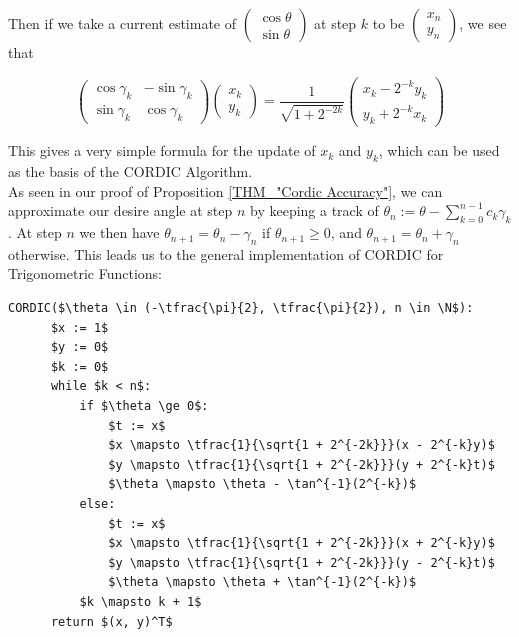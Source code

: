 {Then if we take a current estimate of \(\left(\begin{array}{c}\cos\theta\\\sin\theta\end{array}\right)\) at step \(k\) to be \(\left(\begin{array}{c}x_n\\y_n\end{array}\right)\), we see that

\begin{displaymath}
	\left(\begin{array}{cc}
		\cos\gamma_k & - \sin\gamma_k\\
		\sin\gamma_k & \cos\gamma_k
	\end{array}\right)
	\left(\begin{array}{c}
		x_k \\ y_k
	\end{array}\right)
	= \frac{1}{\sqrt{1 + 2^{-2k}}}
	\left(\begin{array}{c}
		x_k - 2^{-k}y_k\\
		y_k + 2^{-k}x_k
	\end{array}\right)
\end{displaymath}

This gives a very simple formula for the update of \(x_k\) and \(y_k\), which can be used as the basis of the CORDIC Algorithm.\\

As seen in our proof of Proposition \ref{THM_"Cordic Accuracy"}, we can approximate our desire angle at step \(n\) by keeping a track of \(\theta_n := \theta - \sum_{k=0}^{n-1}c_k\gamma_k\). At step \(n\) we then have \(\theta_{n+1} = \theta_n - \gamma_n\) if \(\theta_{n+1} \ge 0\), and \(\theta_{n+1} = \theta_n + \gamma_n\) otherwise. This leads us to the general implementation of CORDIC for Trigonometric Functions:

\begin{lstlisting}[caption={General Cordic},label={PCD_"General_Cordic"}]
  CORDIC($\theta \in (-\tfrac{\pi}{2}, \tfrac{\pi}{2}), n \in \N$):
      $x := 1$
      $y := 0$
      $k := 0$
      while $k < n$:
          if $\theta \ge 0$:
              $t := x$
              $x \mapsto \tfrac{1}{\sqrt{1 + 2^{-2k}}}(x - 2^{-k}y)$
              $y \mapsto \tfrac{1}{\sqrt{1 + 2^{-2k}}}(y + 2^{-k}t)$
              $\theta \mapsto \theta - \tan^{-1}(2^{-k})$
          else:
              $t := x$
              $x \mapsto \tfrac{1}{\sqrt{1 + 2^{-2k}}}(x + 2^{-k}y)$
              $y \mapsto \tfrac{1}{\sqrt{1 + 2^{-2k}}}(y - 2^{-k}t)$
              $\theta \mapsto \theta + \tan^{-1}(2^{-k})$
          $k \mapsto k + 1$
      return $(x, y)^T$
\end{lstlisting}

}
